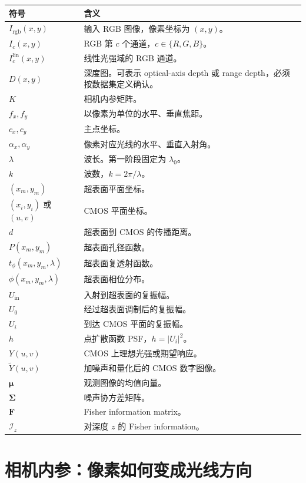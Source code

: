 \documentclass[11pt,a4paper,fontset=none]{ctexart}
\begin{document}
\begin{longtable}{p{3.4cm}p{10.4cm}}
\toprule
符号 & 含义 \\
\midrule
\endhead
$I_{\mathrm{rgb}}(x,y)$ & 输入 RGB 图像，像素坐标为 $(x,y)$。 \\
$I_c(x,y)$ & RGB 第 $c$ 个通道，$c\in\{R,G,B\}$。 \\
$I_c^{\mathrm{lin}}(x,y)$ & 线性光强域的 RGB 通道。 \\
$D(x,y)$ & 深度图。可表示 optical-axis depth 或 range depth，必须按数据集定义确认。 \\
$K$ & 相机内参矩阵。 \\
$f_x,f_y$ & 以像素为单位的水平、垂直焦距。 \\
$c_x,c_y$ & 主点坐标。 \\
$\alpha_x,\alpha_y$ & 像素对应光线的水平、垂直入射角。 \\
$\lambda$ & 波长。第一阶段固定为 $\lambda_0$。 \\
$k$ & 波数，$k=2\pi/\lambda$。 \\
$(x_m,y_m)$ & 超表面平面坐标。 \\
$(x_i,y_i)$ 或 $(u,v)$ & CMOS 平面坐标。 \\
$d$ & 超表面到 CMOS 的传播距离。 \\
$P(x_m,y_m)$ & 超表面孔径函数。 \\
$t_\phi(x_m,y_m,\lambda)$ & 超表面复透射函数。 \\
$\phi(x_m,y_m,\lambda)$ & 超表面相位分布。 \\
$U_{\mathrm{in}}$ & 入射到超表面的复振幅。 \\
$U_0$ & 经过超表面调制后的复振幅。 \\
$U_i$ & 到达 CMOS 平面的复振幅。 \\
$h$ & 点扩散函数 PSF，$h=|U_i|^2$。 \\
$Y(u,v)$ & CMOS 上理想光强或期望响应。 \\
$\tilde Y(u,v)$ & 加噪声和量化后的 CMOS 数字图像。 \\
$\bm\mu$ & 观测图像的均值向量。 \\
$\bm\Sigma$ & 噪声协方差矩阵。 \\
$\bm F$ & Fisher information matrix。 \\
$\mathcal I_z$ & 对深度 $z$ 的 Fisher information。 \\
\bottomrule
\end{longtable}

\section{相机内参：像素如何变成光线方向}
\end{document}
